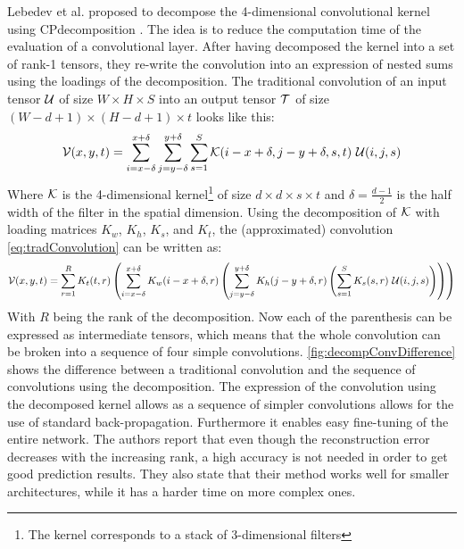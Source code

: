 Lebedev et al. proposed to decompose the 4-dimensional convolutional kernel using CP\Hyphdash decomposition \cite{Lebedev2015}. The idea is to reduce the computation time of the evaluation of a convolutional layer. After having decomposed the kernel into a set of rank-1 tensors, they re-write the convolution into an expression of nested sums using the loadings of the decomposition. The traditional convolution of an input tensor $\mathcal{U}$ of size $W \times H \times S$ into an output tensor $\mathcal{T}$ of size $(W-d+1)\times (H-d+1)\times t$ looks like this:
\begin{equation}
    \mathcal{V}(x, y, t)=\sum_{i=x-\delta}^{x+\delta} \sum_{j=y-\delta}^{y+\delta} \sum_{s=1}^{S} \mathcal{K}(i-x+\delta, j-y+\delta, s, t) \ \mathcal{U}(i, j, s)
    \label{eq:tradConvolution}
\end{equation}
Where $\mathcal{K}$ is the 4-dimensional kernel\footnote{The kernel corresponds to a stack of 3-dimensional filters} of size $d\times d \times s\times t$ and $\delta = \frac{d-1}{2}$ is the half width of the filter in the spatial dimension. Using the decomposition of $\mathcal{K}$ with loading matrices $K_w$, $K_h$, $K_s$, and $K_t$, the (approximated) convolution \eqref{eq:tradConvolution} can be written as:
\begin{equation}
    \mathcal{V}(x, y, t) = \sum_{r=1}^{R} K_{t}(t, r)\left(\sum_{i=x-\delta}^{x+\delta} K_{w}(i-x+\delta, r)\left(\sum_{j=y-\delta}^{y+\delta} K_{h}(j-y+\delta, r)\left(\sum_{s=1}^{S} K_{s}(s, r) \ \mathcal{U}(i, j, s)\right)\right)\right)
\end{equation}
With $R$ being the rank of the decomposition. Now each of the parenthesis can be expressed as intermediate tensors, which means that the whole convolution can be broken into a sequence of four simple convolutions. \autoref{fig:decompConvDifference} shows the difference between a traditional convolution and the sequence of convolutions using the decomposition. The expression of the convolution using the decomposed kernel allows as a sequence of simpler convolutions allows for the use of standard back-propagation. Furthermore it enables easy fine-tuning of the entire network. The authors report that even though the reconstruction error decreases with the increasing rank, a high accuracy is not needed in order to get good prediction results. They also state that their method works well for smaller architectures, while it has a harder time on more complex ones.

